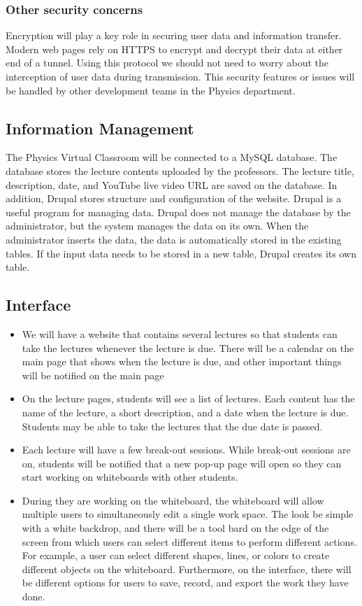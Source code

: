 \documentclass[10pt]{article}
\begin{document}
        \subsubsection{Other security concerns}
            Encryption will play a key role in securing user data and information transfer. Modern web pages rely on HTTPS to encrypt and decrypt their data at either end of a tunnel. Using this protocol we should not need to worry about the interception of user data during transmission. This security features or issues will be handled by other development teams in the Physics department. 
        
    \subsection{Information Management}
        The Physics Virtual Classroom will be connected to a MySQL database. The database stores the lecture contents uploaded by the professors. The lecture title, description, date, and YouTube live video URL are saved on the database. In addition, Drupal stores structure and configuration of the website. Drupal is a useful program for managing data. Drupal does not manage the database by the administrator, but the system manages the data on its own. When the administrator inserts the data, the data is automatically stored in the existing tables. If the input data needs to be stored in a new table, Drupal creates its own table.

    \subsection{Interface}
        \begin{itemize}
            \item We will have a website that contains several lectures so that students can take the lectures whenever the lecture is due. There will be a calendar on the main page that shows when the lecture is due, and other important things will be notified on the main page
            \item On the lecture pages, students will see a list of lectures. Each content has the name of the lecture, a short description, and a date when the lecture is due. Students may be able to take the lectures that the due date is passed.
            \item Each lecture will have a few break-out sessions. While break-out sessions are on, students will be notified that a new pop-up page will open so they can start working on whiteboards with other students. 
            \item During they are working on the whiteboard, the whiteboard will allow multiple users to simultaneously edit a single work space. The look be simple with a white backdrop, and there will be a tool bard on the edge of the screen from which users can select different items to perform different actions. For example, a user can select different shapes, lines, or colors to create different objects on the whiteboard. Furthermore, on the interface, there will be different options for users to save, record, and export the work they have done.
        \end{itemize}
        
\end{document}
